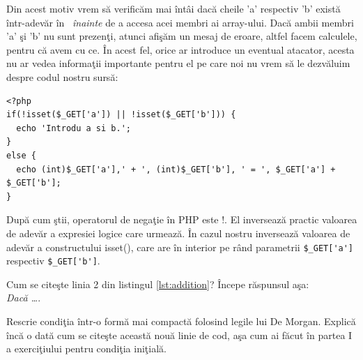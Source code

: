 Din acest motiv vrem să verificăm mai întâi
dacă cheile 'a' respectiv 'b' există într-adevăr în \get\ \textit{înainte}
de a accesa acei membri ai array-ului. Dacă ambii membri 'a'
şi 'b' nu sunt prezenţi, atunci afişăm un mesaj de eroare,
altfel facem calculele, pentru că avem cu ce. În acest fel,
orice ar introduce un eventual atacator, acesta nu ar
vedea informaţii importante pentru el pe care noi nu vrem
să le dezvăluim despre codul nostru sursă:
\begin{lstlisting}[label=lst:addition,caption={Un calculator simplu}]
<?php
if(!isset($_GET['a']) || !isset($_GET['b'])) {
  echo 'Introdu a si b.';
}
else {
  echo (int)$_GET['a'],' + ', (int)$_GET['b'], ' = ', $_GET['a'] + $_GET['b'];
}
\end{lstlisting}
După cum ştii, operatorul de negaţie în PHP este !. El inversează practic valoarea
de adevăr a expresiei logice care urmează. În cazul nostru inversează
valoarea de adevăr a constructului isset(),
care are în interior pe rând parametrii \verb|$_GET['a']| respectiv  \verb|$_GET['b']|.
\begin{Exercise}[title={Înţelege expresia logică},difficulty=1]
\ExePart
Cum se citeşte linia 2 din listingul \ref{lst:addition}? Începe răspunsul aşa:\\
\textit{Dacă \ldots}.

\ExePart

Rescrie condiţia într-o formă {\glqq}mai compactă{\grqq} folosind legile lui De Morgan.
Explică încă o dată cum se citeşte această nouă linie de cod, aşa cum
ai făcut în partea I a exerciţiului pentru condiţia iniţială.
\end{Exercise}


